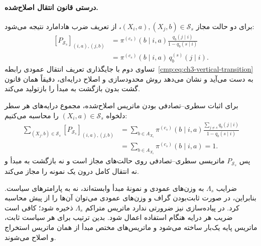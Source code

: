 \paragraph{درستی قانون انتقال اصلاح‌شده.}
برای دو حالت مجاز $(X_i,a),(X_j,b)\in\mathcal S_s$،
از تعریف ضرب هادامارد نتیجه می‌شود:
\begin{equation}\label{cmp:eq:ch3-origin-transition-entry}
\boxed{
\begin{aligned}
[P_{\mathcal S_s}]_{(i,a),(j,b)}
&=\pi^{(c_s)}(b\mid i,a)
\frac{q_b(j\mid i)}{1-q_b(s\mid i)}\\
&=\pi^{(c_s)}(b\mid i,a)\,q_b^{(s)}(j\mid i).
\end{aligned}
}
\end{equation}
تساوی دوم با جایگذاری تعریف انتقال عمودی
رابطه~\eqref{cmp:eq:ch3-vertical-transition}
به دست می‌آید و نشان می‌دهد روش محدودسازی
و اصلاح درایه‌ای، دقیقاً همان قانون گشت
بدون بازگشت به مبدأ را بازتولید می‌کند.

برای اثبات سطری--تصادفی بودن ماتریس
اصلاح‌شده، مجموع درایه‌های هر سطر دلخواه
$(X_i,a)\in\mathcal S_s$ را محاسبه می‌کنیم:
\begin{equation}\label{cmp:eq:ch3-origin-row-stochastic}
\boxed{
\begin{aligned}
\sum_{(X_j,b)\in\mathcal S_s}
[P_{\mathcal S_s}]_{(i,a),(j,b)}
&=\sum_{b\in A_{X_i}}\pi^{(c_s)}(b\mid i,a)
\frac{\sum_{j\ne s}q_b(j\mid i)}
{1-q_b(s\mid i)}\\
&=\sum_{b\in A_{X_i}}\pi^{(c_s)}(b\mid i,a)=1.
\end{aligned}
}
\end{equation}
پس $P_{\mathcal S_s}$ ماتریسی سطری--تصادفی
روی حالت‌های مجاز است و نه بازگشت به مبدأ
و نه انتقال کامل درون یک نمونه را مجاز می‌کند.

ضرایب $\Lambda_s$ به وزن‌های عمودی و نمونهٔ
مبدأ وابسته‌اند، نه به پارامترهای سیاست.
بنابراین، در صورت ثابت‌بودن گراف و وزن‌های
عمودی می‌توان آن‌ها را از پیش محاسبه کرد.
در پیاده‌سازی نیز ضرورتی ندارد ماتریس
متراکم $\Lambda_s$ ذخیره شود؛ کافی است
ضریب هر درایه هنگام استفاده اعمال شود.
بدین ترتیب برای هر سیاست ثابت، ماتریس پایه
یک‌بار ساخته می‌شود و ماتریس‌های مختص
مبدأ از همان ماتریس استخراج و اصلاح می‌شوند.

